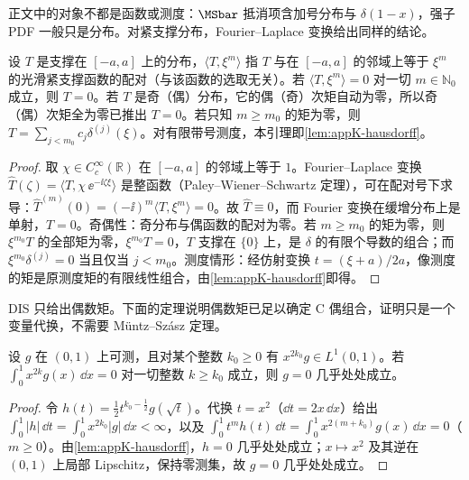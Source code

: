 正文中的对象不都是函数或测度：$\MSbar$ 抵消项含加号分布与 $\delta(1-x)$，强子 PDF 一般只是分布。对紧支撑分布，Fourier--Laplace 变换给出同样的结论。

\begin{lemma}[紧支撑分布由其矩决定]\label{lem:appK-compact}
设 $T$ 是支撑在 $[-a,a]$ 上的分布，$\langle T,\xi^m\rangle$ 指 $T$ 与在 $[-a,a]$ 的邻域上等于 $\xi^m$ 的光滑紧支撑函数的配对（与该函数的选取无关）。若 $\langle T,\xi^m\rangle=0$ 对一切 $m\in\mathbb N_0$ 成立，则 $T=0$。若 $T$ 是奇（偶）分布，它的偶（奇）次矩自动为零，所以奇（偶）次矩全为零已推出 $T=0$。若只知 $m\ge m_0$ 的矩为零，则 $T=\sum_{j<m_0}c_j\delta^{(j)}(\xi)$。对有限带号测度，本引理即\cref{lem:appK-hausdorff}。
\end{lemma}

\begin{proof}
取 $\chi\in C_c^\infty(\mathbb R)$ 在 $[-a,a]$ 的邻域上等于 $1$。Fourier--Laplace 变换 $\hat T(\zeta)=\langle T,\chi\,\ee^{-\ii\zeta\xi}\rangle$ 是整函数（Paley--Wiener--Schwartz 定理\cite[定理~7.3.1]{Hormander2003}），可在配对号下求导：$\hat T^{(m)}(0)=(-\ii)^m\langle T,\xi^m\rangle=0$。故 $\hat T\equiv0$，而 Fourier 变换在缓增分布上是单射\cite[第~7.1~节]{Hormander2003}，$T=0$。奇偶性：奇分布与偶函数的配对为零。若 $m\ge m_0$ 的矩为零，则 $\xi^{m_0}T$ 的全部矩为零，$\xi^{m_0}T=0$，$T$ 支撑在 $\{0\}$ 上，是 $\delta$ 的有限个导数的组合\cite[定理~2.3.4]{Hormander2003}；而 $\xi^{m_0}\delta^{(j)}=0$ 当且仅当 $j<m_0$。测度情形：经仿射变换 $t=(\xi+a)/2a$，像测度的矩是原测度矩的有限线性组合，由\cref{lem:appK-hausdorff}即得。
\end{proof}

DIS 只给出偶数矩。下面的定理说明偶数矩已足以确定 C 偶组合，证明只是一个变量代换，不需要 Müntz--Szász 定理。

\begin{theorem}[偶数矩决定函数]\label{thm:appK-even-moments}
设 $g$ 在 $(0,1)$ 上可测，且对某个整数 $k_0\ge0$ 有 $x^{2k_0}g\in L^1(0,1)$。若 $\int_0^1x^{2k}g(x)\,\dd x=0$ 对一切整数 $k\ge k_0$ 成立，则 $g=0$ 几乎处处成立。
\end{theorem}

\begin{proof}
令 $h(t)=\frac12t^{k_0-\frac12}g(\sqrt t)$。代换 $t=x^2$（$\dd t=2x\,\dd x$）给出 $\int_0^1|h|\,\dd t=\int_0^1x^{2k_0}|g|\,\dd x<\infty$，以及 $\int_0^1t^mh(t)\,\dd t=\int_0^1x^{2(m+k_0)}g(x)\,\dd x=0$（$m\ge0$）。由\cref{lem:appK-hausdorff}，$h=0$ 几乎处处成立；$x\mapsto x^2$ 及其逆在 $(0,1)$ 上局部 Lipschitz，保持零测集，故 $g=0$ 几乎处处成立。
\end{proof}


